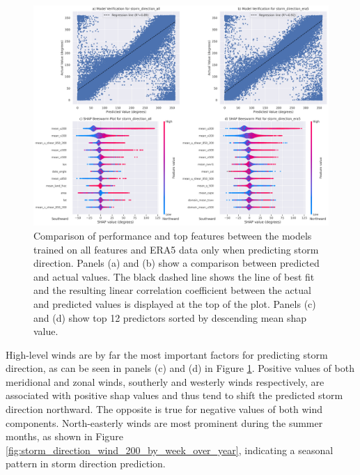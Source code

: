 \begin{figure}[ht]
    \centering
    \includegraphics[width=\textwidth]{../figures/generated/experiments/storm_direction/storm_direction_summary.png}
    \caption{Comparison of performance and top features between the models trained on all features and ERA5 data only when predicting storm direction. Panels (a) and (b) show a comparison between predicted and actual values. The black dashed line shows the line of best fit and the resulting linear correlation coefficient between the actual and predicted values is displayed at the top of the plot. Panels (c) and (d) show top 12 predictors sorted by descending mean \acrshort{shap} value.}
    \label{fig:storm_direction_summary}
\end{figure}

High-level winds are by far the most important factors for predicting storm direction, as can be seen in panels (c) and (d) in Figure \ref{fig:storm_direction_summary}. Positive values of both meridional and zonal winds, southerly and westerly winds respectively, are associated with positive \acrshort{shap} values and thus tend to shift the predicted storm direction northward. The opposite is true for negative values of both wind components. North-easterly winds are most prominent during the summer months, as shown in Figure \ref{fig:storm_direction_wind_200_by_week_over_year}, indicating a seasonal pattern in storm direction prediction.

